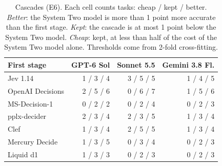 \begin{table}[t]
\centering
\footnotesize
\setlength{\tabcolsep}{3pt}
\begin{tabular}{@{}lrrr@{}}
\toprule
First stage & GPT-6 Sol & Sonnet 5.5 & Gemini 3.8 Fl. \\
\midrule
Jev 1.14 & 1 / 3 / 4 & 3 / 5 / 5 & 1 / 4 / 5 \\
OpenAI Decisions & 2 / 5 / 6 & 0 / 6 / 7 & 1 / 5 / 6 \\
MS-Decision-1 & 0 / 2 / 2 & 0 / 2 / 4 & 0 / 2 / 3 \\
pplx-decider & 2 / 3 / 4 & 2 / 3 / 5 & 1 / 3 / 4 \\
Clef & 1 / 3 / 4 & 2 / 5 / 5 & 1 / 3 / 4 \\
Mercury Decide & 1 / 3 / 5 & 0 / 3 / 4 & 0 / 2 / 3 \\
Liquid d1 & 1 / 3 / 3 & 0 / 2 / 3 & 0 / 2 / 3 \\
\bottomrule
\end{tabular}
\caption{Cascades (E6). Each cell counts tasks: cheap / kept / better. \emph{Better}: the System Two model is more than 1 point more accurate than the first stage. \emph{Kept}: the cascade is at most 1 point below the System Two model. \emph{Cheap}: kept, at less than half of the cost of the System Two model alone. Thresholds come from 2-fold cross-fitting.}
\label{tab:e6}
\end{table}
